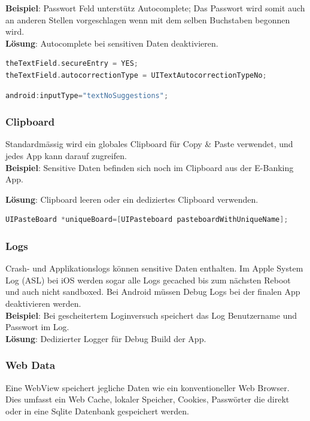 \textbf{Beispiel}: Passwort Feld unterstütz Autocomplete; Das Passwort wird somit auch an anderen Stellen vorgeschlagen wenn mit dem selben Buchstaben begonnen wird. \\

\textbf{Lösung}: Autocomplete bei sensitiven Daten deaktivieren.
\begin{lstlisting}[language=C, caption=Lösung für iOS]
theTextField.secureEntry = YES;
theTextField.autocorrectionType = UITextAutocorrectionTypeNo;
\end{lstlisting}
\begin{lstlisting}[language=Java, caption=Lösung für Android]
android:inputType="textNoSuggestions";
\end{lstlisting}

\subsubsection{Clipboard}
Standardmässig wird ein globales Clipboard für Copy \& Paste verwendet, und jedes App kann darauf zugreifen. \\
\textbf{Beispiel}: Sensitive Daten befinden sich noch im Clipboard aus der E-Banking App.

\textbf{Lösung}: Clipboard leeren oder ein dediziertes Clipboard verwenden.
\begin{lstlisting}[language=C, caption=Lösung für iOS]
UIPasteBoard *uniqueBoard=[UIPasteboard pasteboardWithUniqueName];
\end{lstlisting}

\subsubsection{Logs}
Crash- und Applikationslogs können sensitive Daten enthalten. Im Apple System Log (ASL) bei iOS werden sogar alle Logs gecached bis zum nächsten Reboot und auch nicht sandboxed. Bei Android müssen Debug Logs bei der finalen App deaktivieren werden. \\

\textbf{Beispiel}: Bei gescheitertem Loginversuch speichert das Log Benutzername und Passwort im Log. \\

\textbf{Lösung}: Dedizierter Logger für Debug Build der App.

\subsubsection{Web Data}
Eine WebView speichert jegliche Daten wie ein konventioneller Web Browser. Dies umfasst ein Web Cache, lokaler Speicher, Cookies, Passwörter die direkt oder in eine Sqlite Datenbank gespeichert werden. \\

